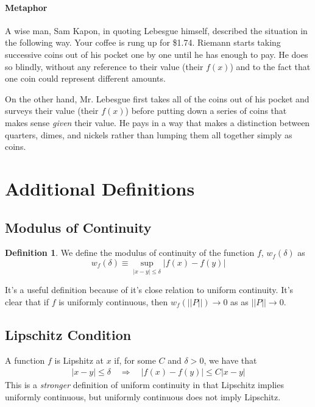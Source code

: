 \documentclass[12pt]{article}
\theoremstyle{plain}
\theoremstyle{definition}
\newtheorem{defn}[thm]{Definition}
\theoremstyle{remark}
\begin{document}
\paragraph{Metaphor}
A wise man, Sam Kapon, in quoting Lebesgue himself, described the situation in the following way. Your coffee is rung up for \$1.74. Riemann starts taking successive coins out of his pocket one by one until he has enough to pay. He does so blindly, without any reference to their value (their $f(x)$) and to the fact that one coin could represent different amounts.

On the other hand, Mr. Lebesgue first takes all of the coins out of his pocket and surveys their value (their $f(x)$) before putting down a series of coins that makes sense \emph{given} their value. He pays in a way that makes a distinction between quarters, dimes, and nickels rather than lumping them all together simply as coins. 



\newpage
\appendix
\section{Additional Definitions}

\subsection{Modulus of Continuity}

\begin{defn} We define the modulus of continuity of the function $f$, $w_f(\delta)$ as 
\begin{equation}
    w_f(\delta) \equiv \sup_{|x-y|\leq\delta} |f(x)-f(y)|
\end{equation}
\end{defn}
It's a useful definition because of it's close relation to uniform continuity.
It's clear that if $f$ is uniformly continuous, then $w_f\left(||P||\right)\rightarrow0$ as as $||P||\rightarrow0$.

\subsection{Lipschitz Condition}

A function $f$ is Lipshitz at $x$ if, for some $C$ and $\delta>0$, we have that 
\begin{align*}
    |x-y|\leq \delta \quad \Rightarrow \quad 
        |f(x) - f(y)|\leq C|x-y|
\end{align*}
This is a \emph{stronger} definition of uniform continuity in that Lipschitz implies uniformly continuous, but uniformly continuous does not imply Lipschitz.
\end{document}
